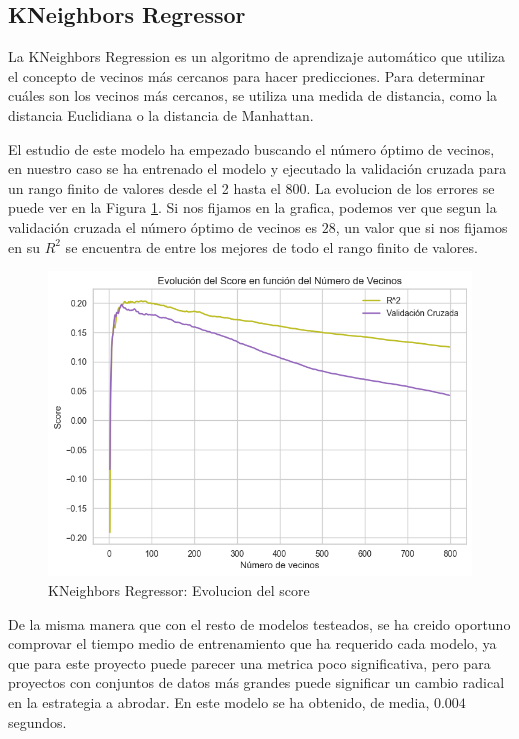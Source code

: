 \subsection{KNeighbors Regressor}

La KNeighbors Regression es un algoritmo de aprendizaje automático que utiliza el concepto de vecinos más cercanos para hacer predicciones. Para determinar cuáles son los vecinos más cercanos, se utiliza una medida de distancia, como la distancia Euclidiana o la distancia de Manhattan.
\newline

El estudio de este modelo ha empezado buscando el número óptimo de vecinos, en nuestro caso se ha entrenado el modelo y ejecutado la validación cruzada para un rango finito de valores desde el 2 hasta el 800. La evolucion de los errores se puede ver en la Figura \ref{Modelos-Lineales-kneigh-Evolucion-score}. Si nos fijamos en la grafica, podemos ver que segun la validación cruzada el número óptimo de vecinos es $28$, un valor que si nos fijamos en su $R^2$ se encuentra de entre los mejores de todo el rango finito de valores.

\begin{figure}[H]
    \centering
    \includegraphics[width=\figsize]{images/linearModelKNeighEvolucionError.png}
    \caption{KNeighbors Regressor: Evolucion del score}
    \label{Modelos-Lineales-kneigh-Evolucion-score}
\end{figure}

De la misma manera que con el resto de modelos testeados, se ha creido oportuno comprovar el tiempo medio de entrenamiento que ha requerido cada modelo, ya que para este proyecto puede parecer una metrica poco significativa, pero para proyectos con conjuntos de datos más grandes puede significar un cambio radical en la estrategia a abrodar. En este modelo se ha obtenido, de media, $0.004$ segundos.

